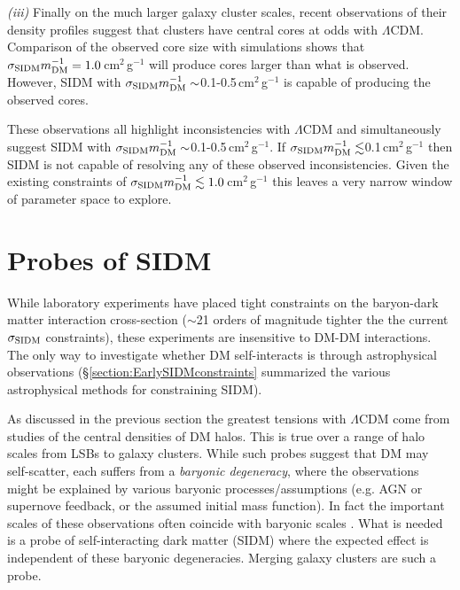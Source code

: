 {\it (iii)} Finally on the much larger galaxy cluster scales, recent observations of their density profiles \citep{Newman:2012wt, Newman:2012tk} suggest that clusters have central cores at odds with $\Lambda$CDM.
Comparison of the observed core size with simulations \citep{Peter:2012vi, Rocha:2012tr} shows that $\sigma_{\rm SIDM}m_{\rm DM}^{-1} = 1.0$\,cm$^2$\,g$^{-1}$ will produce cores larger than what is observed.
However, SIDM with $\sigma_{\rm SIDM}m_{\rm DM}^{-1} \sim$0.1-0.5\,cm$^2$\,g$^{-1}$ is capable of producing the observed cores.

These observations all highlight inconsistencies with $\Lambda$CDM and simultaneously suggest SIDM with $\sigma_{\rm SIDM}m_{\rm DM}^{-1}  \sim$0.1-0.5\,cm$^2$\,g$^{-1}$.
If $\sigma_{\rm SIDM}m_{\rm DM}^{-1}  \lesssim$0.1\,cm$^2$\,g$^{-1}$ then SIDM is not capable of resolving any of these observed inconsistencies.
Given the existing constraints of $\sigma_{\rm SIDM}m_{\rm DM}^{-1}\lesssim 1.0$\,cm$^2$\,g$^{-1}$ this leaves a very narrow window of parameter space to explore.

\section{Probes of SIDM}\label{section:SIDMprobes}

While laboratory experiments have placed tight constraints on the baryon-dark matter interaction cross-section ($\sim$21 orders of magnitude tighter the the current $\sigma_{\rm SIDM}$ constraints), these experiments are insensitive to DM-DM interactions.
The only way to investigate whether DM self-interacts is through astrophysical observations (\S\ref{section:EarlySIDMconstraints} summarized the various astrophysical methods for constraining SIDM). 

As discussed in the previous section the greatest tensions with $\Lambda$CDM come from studies of the central densities of DM halos.
This is true over a range of halo scales from LSBs to galaxy clusters.
While such probes suggest that DM may self-scatter, each suffers from a \emph{baryonic degeneracy}, where the observations might be explained by various baryonic processes/assumptions (e.g. AGN or supernove feedback, or the assumed initial mass function).
In fact the important scales of these observations often coincide with baryonic scales \citep[e.g. the core size in clusters is approximately the size of the brightest cluster galaxy;][]{Newman:2012wt, Newman:2012tk}.
What is needed is a probe of self-interacting dark matter (SIDM) where the expected effect is independent of these baryonic degeneracies.
Merging galaxy clusters are such a probe. 

